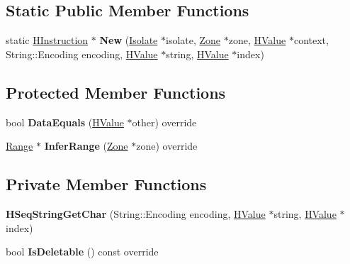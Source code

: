 \subsection*{Static Public Member Functions}
\begin{DoxyCompactItemize}
\item 
static \hyperlink{classv8_1_1internal_1_1_h_instruction}{H\+Instruction} $\ast$ {\bfseries New} (\hyperlink{classv8_1_1internal_1_1_isolate}{Isolate} $\ast$isolate, \hyperlink{classv8_1_1internal_1_1_zone}{Zone} $\ast$zone, \hyperlink{classv8_1_1internal_1_1_h_value}{H\+Value} $\ast$context, String\+::\+Encoding encoding, \hyperlink{classv8_1_1internal_1_1_h_value}{H\+Value} $\ast$string, \hyperlink{classv8_1_1internal_1_1_h_value}{H\+Value} $\ast$index)\hypertarget{classv8_1_1internal_1_1_h_seq_string_get_char_a67ad9c9215f45bdb856f32b68bb68d56}{}\label{classv8_1_1internal_1_1_h_seq_string_get_char_a67ad9c9215f45bdb856f32b68bb68d56}

\end{DoxyCompactItemize}
\subsection*{Protected Member Functions}
\begin{DoxyCompactItemize}
\item 
bool {\bfseries Data\+Equals} (\hyperlink{classv8_1_1internal_1_1_h_value}{H\+Value} $\ast$other) override\hypertarget{classv8_1_1internal_1_1_h_seq_string_get_char_a8fbd5bd6a7683fd68631e258d0e6fb10}{}\label{classv8_1_1internal_1_1_h_seq_string_get_char_a8fbd5bd6a7683fd68631e258d0e6fb10}

\item 
\hyperlink{classv8_1_1internal_1_1_range}{Range} $\ast$ {\bfseries Infer\+Range} (\hyperlink{classv8_1_1internal_1_1_zone}{Zone} $\ast$zone) override\hypertarget{classv8_1_1internal_1_1_h_seq_string_get_char_a2c140c6f731e54b5afe0dc336e4a859b}{}\label{classv8_1_1internal_1_1_h_seq_string_get_char_a2c140c6f731e54b5afe0dc336e4a859b}

\end{DoxyCompactItemize}
\subsection*{Private Member Functions}
\begin{DoxyCompactItemize}
\item 
{\bfseries H\+Seq\+String\+Get\+Char} (String\+::\+Encoding encoding, \hyperlink{classv8_1_1internal_1_1_h_value}{H\+Value} $\ast$string, \hyperlink{classv8_1_1internal_1_1_h_value}{H\+Value} $\ast$index)\hypertarget{classv8_1_1internal_1_1_h_seq_string_get_char_ad38da6771b565df54a0620a488b91e08}{}\label{classv8_1_1internal_1_1_h_seq_string_get_char_ad38da6771b565df54a0620a488b91e08}

\item 
bool {\bfseries Is\+Deletable} () const  override\hypertarget{classv8_1_1internal_1_1_h_seq_string_get_char_adda30c224c5df48e09bf12eeab190c69}{}\label{classv8_1_1internal_1_1_h_seq_string_get_char_adda30c224c5df48e09bf12eeab190c69}

\end{DoxyCompactItemize}
